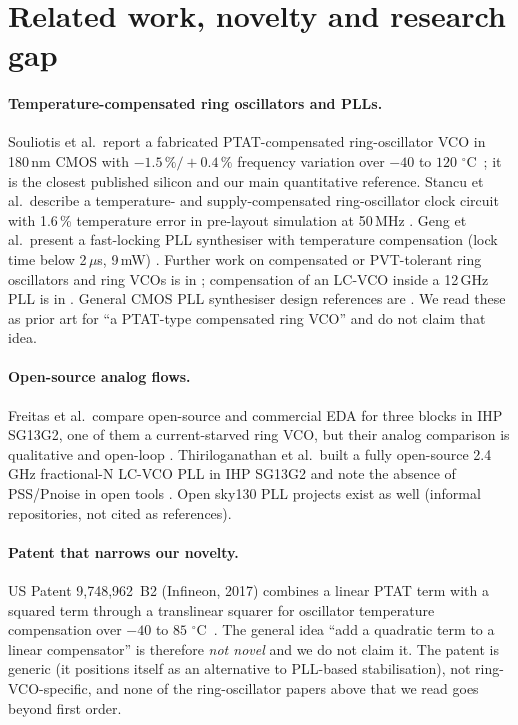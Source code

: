 \documentclass[11pt,a4paper]{article}
\newcommand{\degC}{\,$^\circ$C}
\begin{document}
\section{Related work, novelty and research gap}
\paragraph{Temperature-compensated ring oscillators and PLLs.} Souliotis et al.\ report a fabricated PTAT-compensated ring-oscillator VCO in 180\,nm CMOS with $-1.5\,\%/+0.4\,\%$ frequency variation over $-40$ to $120$\,\degC\ \cite{souliotis22}; it is the closest published silicon and our main quantitative reference. Stancu et al.\ describe a temperature- and supply-compensated ring-oscillator clock circuit with 1.6\,\% temperature error in pre-layout simulation at 50\,MHz \cite{stancu23}. Geng et al.\ present a fast-locking PLL synthesiser with temperature compensation (lock time below 2\,$\mu$s, 9\,mW) \cite{geng18}. Further work on compensated or PVT-tolerant ring oscillators and ring VCOs is in \cite{li22,hammam22,zhang16,patrinos25,sivasakthi24,madheswaran24}; compensation of an LC-VCO inside a 12\,GHz PLL is in \cite{you14}. General CMOS PLL synthesiser design references are \cite{sinha02,raphael19}. We read these as prior art for ``a PTAT-type compensated ring VCO'' and do not claim that idea.

\paragraph{Open-source analog flows.} Freitas et al.\ compare open-source and commercial EDA for three blocks in IHP SG13G2, one of them a current-starved ring VCO, but their analog comparison is qualitative and open-loop \cite{freitas25}. Thiriloganathan et al.\ built a fully open-source 2.4\,GHz fractional-N LC-VCO PLL in IHP SG13G2 and note the absence of PSS/Pnoise in open tools \cite{thiri26}. Open sky130 PLL projects exist as well (informal repositories, not cited as references).

\paragraph{Patent that narrows our novelty.} US Patent 9,748,962~B2 (Infineon, 2017) combines a linear PTAT term with a squared term through a translinear squarer for oscillator temperature compensation over $-40$ to $85$\,\degC\ \cite{ortner17}. The general idea ``add a quadratic term to a linear compensator'' is therefore \emph{not novel} and we do not claim it. The patent is generic (it positions itself as an alternative to PLL-based stabilisation), not ring-VCO-specific, and none of the ring-oscillator papers above that we read goes beyond first order.
\end{document}
